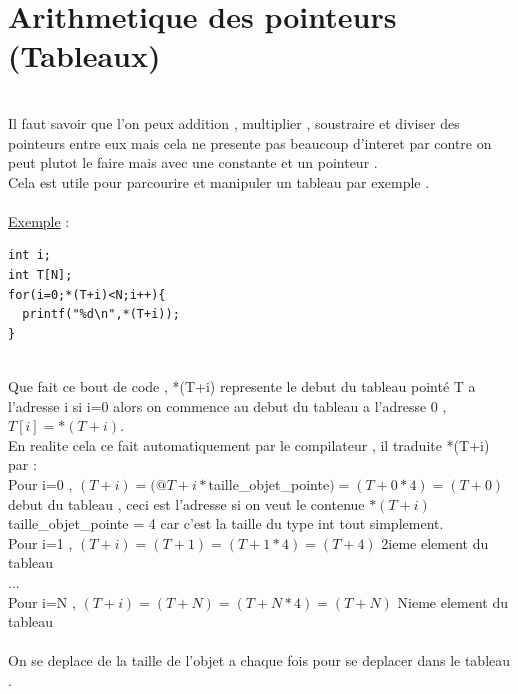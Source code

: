 \documentclass[a4paper,12pt,openany]{book}
\begin{document}
\section{Arithmetique des pointeurs (Tableaux)}
\\
Il faut savoir que l'on peux addition , multiplier , soustraire et diviser des pointeurs entre eux mais cela ne presente pas beaucoup d'interet par contre on peut plutot le faire mais avec une constante et un pointeur .\\
Cela est utile pour parcourire et manipuler un tableau par exemple .\\
\\
\underline{Exemple} : \\
\begin{verbatim}
int i;
int T[N];
for(i=0;*(T+i)<N;i++){
  printf("%d\n",*(T+i));
}
\end{verbatim}
\\
Que fait ce bout de code , *(T+i) represente le debut du tableau point\'e T a l'adresse i si i=0 alors on commence au debut du tableau a l'adresse 0 , $T[i]=*(T+i)$.\\
En realite cela ce fait automatiquement par le compilateur , il traduite *(T+i) par :
\\
Pour i=0 , $(T+i)=(@T+i*$taille\_objet\_pointe$)=(T+0*4)=(T+0)$ debut du tableau , ceci est l'adresse si on veut le contenue $*(T+i)$ \\
taille\_objet\_pointe = 4 car c'est la taille du type int tout simplement.\\
Pour i=1 , $(T+i)=(T+1)=(T+1*4)=(T+4)$ 2ieme element du tableau \\
...\\
Pour i=N , $(T+i)=(T+N)=(T+N*4)=(T+N)$ Nieme element du tableau \\
\\
On se deplace de la taille de l'objet a chaque fois pour se deplacer dans le tableau .
\end{document}
